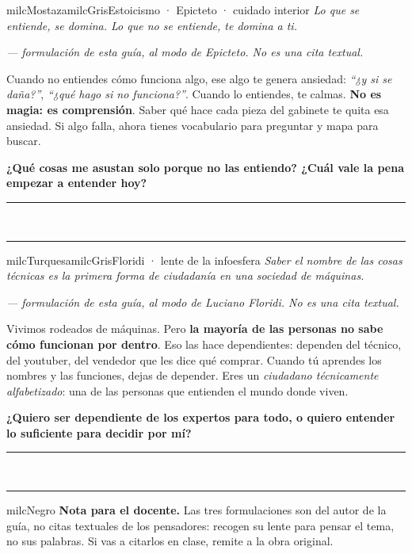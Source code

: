 \documentclass[11pt,letterpaper]{article}
\newcommand{\linead}[1]{\noindent\color{milcLinea}\rule{#1}{0.5pt}\color{milcNegro}}
\begin{document}
\begin{softbox}{milcMostaza}{milcGris}{Estoicismo · Epicteto · cuidado interior}
\textit{Lo que se entiende, se domina. Lo que no se entiende, te domina a ti.}

{\footnotesize\itshape\color{milcNegro!70}--- formulación de esta guía, al modo de Epicteto. No es una cita textual.}

Cuando no entiendes cómo funciona algo, ese algo te genera ansiedad: \emph{``¿y si se daña?''}, \emph{``¿qué hago si no funciona?''}. Cuando lo entiendes, te calmas. \textbf{No es magia: es comprensión}. Saber qué hace cada pieza del gabinete te quita esa ansiedad. Si algo falla, ahora tienes vocabulario para preguntar y mapa para buscar.

\textbf{¿Qué cosas me asustan solo porque no las entiendo? ¿Cuál vale la pena empezar a entender hoy?}
\end{softbox}
\linead{\linewidth}\\[1mm]
\linead{\linewidth}

\begin{softbox}{milcTurquesa}{milcGris}{Floridi · lente de la infoesfera}
\textit{Saber el nombre de las cosas técnicas es la primera forma de ciudadanía en una sociedad de máquinas.}

{\footnotesize\itshape\color{milcNegro!70}--- formulación de esta guía, al modo de Luciano Floridi. No es una cita textual.}

Vivimos rodeados de máquinas. Pero \textbf{la mayoría de las personas no sabe cómo funcionan por dentro}. Eso las hace dependientes: dependen del técnico, del youtuber, del vendedor que les dice qué comprar. Cuando tú aprendes los nombres y las funciones, dejas de depender. Eres un \emph{ciudadano técnicamente alfabetizado}: una de las personas que entienden el mundo donde viven.

\textbf{¿Quiero ser dependiente de los expertos para todo, o quiero entender lo suficiente para decidir por mí?}
\end{softbox}
\linead{\linewidth}\\[1mm]
\linead{\linewidth}

\begin{infoband}{milcNegro}
\textbf{Nota para el docente.} Las tres formulaciones son del autor de la guía, no citas textuales de los pensadores: recogen su lente para pensar el tema, no sus palabras. Si vas a citarlos en clase, remite a la obra original.
\end{infoband}
\end{document}
